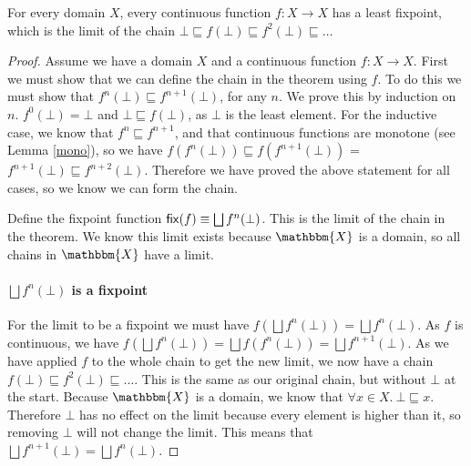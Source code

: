 
\begin{thm}
For every domain $X$, every continuous function $f : X \to X$ has a least fixpoint, which is the limit of the chain $\bot \sqsubseteq f(\bot) \sqsubseteq f^2(\bot) \sqsubseteq \dots$
\end{thm}

\begin{proof}
Assume we have a domain $X$ and a continuous function $f: X \to X$. First we must show that we can define the chain in the theorem using $f$. To do this we must show that $f^n(\bot) \sqsubseteq f^{n+1}(\bot)$, for any $n$. We prove this by induction on $n$. $f^0(\bot) = \bot$ and $\bot \sqsubseteq f(\bot)$, as $\bot$ is the least element. For the inductive case, we know that $f^{n} \sqsubseteq f^{n+1}$, and that continuous functions are monotone (see Lemma \ref{mono}), so we have $f(f^{n}(\bot)) \sqsubseteq f(f^{n+1}(\bot))$ = $f^{n+1}(\bot) \sqsubseteq f^{n+2}(\bot)$. Therefore we have proved the above statement for all cases, so we know we can form the chain.

Define the fixpoint function $\operatorname{\mathsf{fix}}(f) \equiv \bigsqcup f^n (\bot)$. This is the limit of the chain in the theorem. We know this limit exists because $\mathbbm{X}$ is a domain, so all chains in $\mathbbm{X}$ have a limit. %



\paragraph{$\bigsqcup f^n (\bot)$ is a fixpoint}
For the limit to be a fixpoint we must have  $f( \bigsqcup f^n (\bot)) =  \bigsqcup f^n (\bot)$.  As $f$ is continuous, we have $f( \bigsqcup f^n (\bot)) = \bigsqcup f(f^n(\bot)) = \bigsqcup f^{n+1}(\bot)$. As we have applied $f$ to the whole chain to get the new limit, we now have a chain $f(\bot)  \sqsubseteq f^2(\bot) \sqsubseteq \dots$. This is the same as our original chain, but without $\bot$ at the start. Because $\mathbbm{X}$ is a domain, we know that $\forall x \in X. \ \bot \sqsubseteq x$. Therefore $\bot$ has no effect on the limit because every element is higher than it, so removing $\bot$ will not change the limit. This means that $\bigsqcup f^{n+1} (\bot) = \bigsqcup f^n(\bot)$.


\end{proof}
